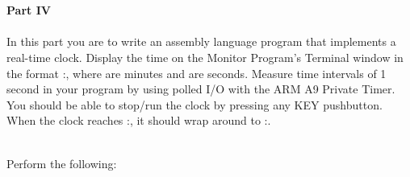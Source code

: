\documentclass[epsfig,10pt,fullpage]{article}
\begin{document}
~\\
~\\
\noindent
{\bf Part IV}
~\\
~\\
\noindent
In this part you are to write an assembly language program that implements a real-time clock. 
Display the time on the Monitor Program's Terminal window in the format 
:, where  are minutes and  are seconds.
Measure time intervals of 1 second in your program by using polled I/O with the ARM A9 
Private Timer.  You should be able to stop/run the clock by pressing any KEY pushbutton.
When the clock reaches :, it should wrap around to :.

~\\
\noindent
Perform the following:
\end{document}
